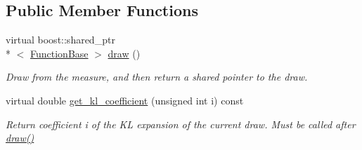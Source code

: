 \subsection*{Public Member Functions}
\begin{DoxyCompactItemize}
\item 
virtual boost\-::shared\-\_\-ptr\\*
$<$ \hyperlink{class_q_u_e_s_o_1_1_function_base}{Function\-Base} $>$ \hyperlink{class_q_u_e_s_o_1_1_infinite_dimensional_gaussian_aa052d66b96ae5bc7f2fae2da9ecf1b2e}{draw} ()
\begin{DoxyCompactList}\small\item\em Draw from the measure, and then return a shared pointer to the draw. \end{DoxyCompactList}\item 
virtual double \hyperlink{class_q_u_e_s_o_1_1_infinite_dimensional_gaussian_a07eac1a9245e12bd3bc73ea65aac5ecf}{get\-\_\-kl\-\_\-coefficient} (unsigned int i) const 
\begin{DoxyCompactList}\small\item\em Return coefficient {\ttfamily i} of the K\-L expansion of the current draw. Must be called after \hyperlink{class_q_u_e_s_o_1_1_infinite_dimensional_gaussian_aa052d66b96ae5bc7f2fae2da9ecf1b2e}{draw()} \end{DoxyCompactList}\end{DoxyCompactItemize}
